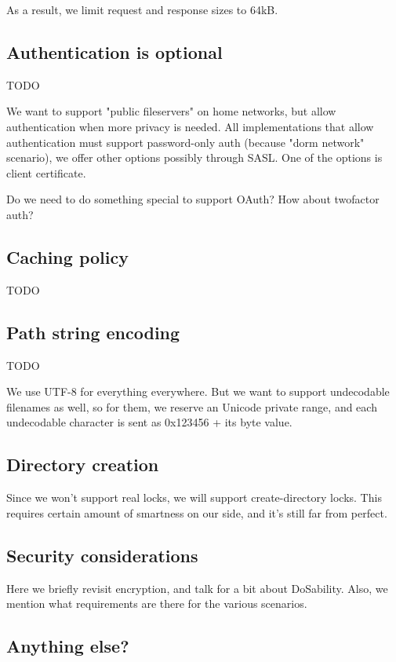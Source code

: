 As a result, we limit request and response sizes to 64kB.

\subsection{Authentication is optional}

TODO

We want to support "public fileservers" on home networks, but allow authentication when more privacy is
needed. All implementations that allow authentication must support password-only auth (because "dorm network"
scenario), we offer other options possibly through SASL. One of the options is client certificate.

Do we need to do something special to support OAuth? How about twofactor auth?

\subsection{Caching policy}

TODO

\subsection{Path string encoding}

TODO

We use UTF-8 for everything everywhere. But we want to support undecodable filenames as well, so for them, we
reserve an Unicode private range, and each undecodable character is sent as 0x123456 + its byte value.

\subsection{Directory creation}

Since we won't support real locks, we will support create-directory locks. This requires certain amount of
smartness on our side, and it's still far from perfect.

\subsection{Security considerations}

Here we briefly revisit encryption, and talk for a bit about DoSability. Also, we mention what requirements
are there for the various scenarios.

\subsection{Anything else?}

